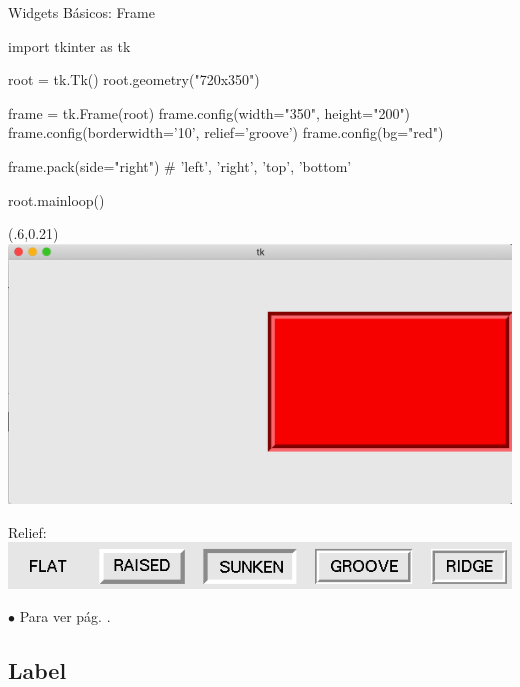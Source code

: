 \documentclass[10pt, envcountsect , spanish]{beamer}
\begin{document}
\begin{frame}[fragile]{Widgets Básicos: Frame}
{}

\begin{pyverbatim}[][frame=single]
import tkinter as tk

root = tk.Tk()
root.geometry("720x350")

frame = tk.Frame(root)
frame.config(width="350", height="200")
frame.config(borderwidth='10', relief='groove')
frame.config(bg="red")

frame.pack(side="right")  # 'left', 'right', 'top', 'bottom'

root.mainloop()
\end{pyverbatim}

\begin{textblock*}{.4\textwidth}(.6\textwidth,0.21\textheight)
\includegraphics[width=\textwidth]{fig/FrameScreen}
\end{textblock*}

\:


\centerline{Relief: \includegraphics[width=.45\textwidth]{fig/relief.png}}

\vfill

{\scriptsize $\bullet$
Para  ver pág. \pageref{pack}.
}
\end{frame}




\subsection{Label}
\end{document}

